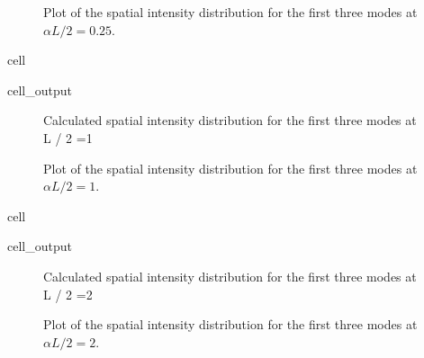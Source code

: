 \documentclass[a4paper,10pt,english,openany,oneside]{jupyterBook}
\begin{document}
\begin{figure}[htbp]
\centering
\capstart

\noindent{}
\caption{Plot of the spatial intensity distribution for the first three modes at \(\alpha L / 2 =0.25\).}\label{\detokenize{Kogelnik-Shank_Coupled-Wave-Theory_DFB-Lasers:kogelnik12a}}\end{figure}

\begin{sphinxuseclass}{cell}\begin{sphinxVerbatimOutput}

\begin{sphinxuseclass}{cell_output}
\begin{figure}[htbp]
\centering
\capstart

\noindent{}
\caption{Calculated spatial intensity distribution for the first three modes at  L / 2 =1}\label{\detokenize{Kogelnik-Shank_Coupled-Wave-Theory_DFB-Lasers:kogelnik12bc}}\end{figure}

\end{sphinxuseclass}\end{sphinxVerbatimOutput}

\end{sphinxuseclass}
\begin{figure}[htbp]
\centering
\capstart

\noindent{}
\caption{Plot of the spatial intensity distribution for the first three modes at \(\alpha L / 2 =1\).}\label{\detokenize{Kogelnik-Shank_Coupled-Wave-Theory_DFB-Lasers:kogelnik12b}}\end{figure}

\begin{sphinxuseclass}{cell}\begin{sphinxVerbatimOutput}

\begin{sphinxuseclass}{cell_output}
\begin{figure}[htbp]
\centering
\capstart

\noindent{}
\caption{Calculated spatial intensity distribution for the first three modes at  L / 2 =2}\label{\detokenize{Kogelnik-Shank_Coupled-Wave-Theory_DFB-Lasers:kogelnik12cc}}\end{figure}

\end{sphinxuseclass}\end{sphinxVerbatimOutput}

\end{sphinxuseclass}
\begin{figure}[htbp]
\centering
\capstart

\noindent{}
\caption{Plot of the spatial intensity distribution for the first three modes at \(\alpha L / 2 =2\).}\label{\detokenize{Kogelnik-Shank_Coupled-Wave-Theory_DFB-Lasers:kogelnik12c}}\end{figure}
\end{document}
